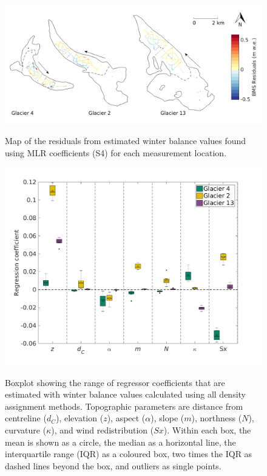 \documentclass{sfuthesis}
\newcommand{\params}{Topographic parameters are distance from centreline ($d_C$), elevation ($z$), aspect ($\alpha$), slope ($m$), northness ($N$), curvature ($\kappa$), and wind redistribution ($Sx$). }
\newcommand{\boxplot}{Within each box, the mean is shown as a circle, the median as a horizontal line, the interquartile range (IQR) as a coloured box, two times the IQR as dashed lines beyond the box, and outliers as single points. }
\begin{document}
\begin{figure}[H]
	\centering
	\includegraphics[width =\textwidth]{residualsMap_MLR.png}\\
	\caption{Map of the residuals from estimated winter balance values found using MLR coefficients (S4) for each measurement location.}
	\label{fig:MLR_residualsMap}
\end{figure} 

\begin{figure}
	\centering
	\includegraphics[width =1\textwidth]{MLRcoeff_DensityOpts.png}\\
	\caption{Boxplot showing the range of regressor coefficients that are estimated with winter balance values calculated using all density assignment methods. \params \boxplot }
	\label{fig:MLRcoeff_densityOptions}
\end{figure}
\end{document}
